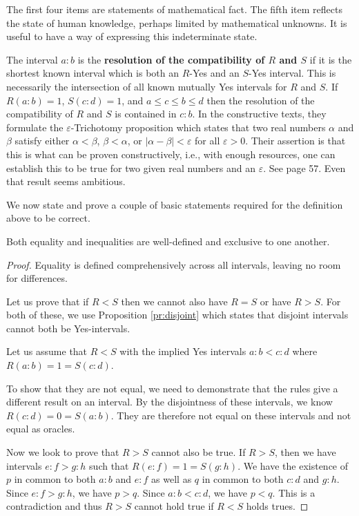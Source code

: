 \documentclass[12pt]{article}
\begin{document}
The first four items are statements of mathematical fact. The fifth item reflects the state of human knowledge, perhaps limited by mathematical unknowns. It is useful to have a way of expressing this indeterminate state. 

The interval $a:b$ is the \textbf{resolution of the compatibility of $R$ and $S$} if it is the shortest known interval which is both an $R$-Yes and an $S$-Yes interval. This is necessarily the intersection of all known mutually Yes intervals for $R$ and $S$.  If $R(a:b) = 1$, $S(c:d) = 1$, and $ a \leq c \leq b \leq d$ then the resolution of the compatibility of $R$ and $S$ is contained in $c:b$. In the constructive texts, they formulate the $\varepsilon$-Trichotomy proposition which states that two real numbers $\alpha$ and $\beta$ satisfy either $\alpha < \beta$, $\beta < \alpha$, or $|\alpha - \beta| < \varepsilon$ for all $\varepsilon > 0$. Their assertion is that this is what can be proven constructively, i.e., with enough resources, one can establish this to be true for two given real numbers and an $\varepsilon$. See \cite{bridger} page 57. Even that result seems ambitious. 

We now state and prove a couple of basic statements required for the definition above to be correct. 

\begin{proposition}\label{pr:wd}
Both equality and inequalities are well-defined and exclusive to one another.  
\end{proposition}

\begin{proof}
Equality is defined comprehensively across all intervals, leaving no room for differences. 

Let us prove that if $R < S$ then we cannot also have $R=S$ or have $R > S$. For both of these, we use Proposition \ref{pr:disjoint} which states that disjoint intervals cannot both be Yes-intervals. 

Let us assume that $R<S$ with the implied Yes intervals $a:b < c:d$ where $R(a:b)=1 =S(c:d)$.

To show that they are not equal, we need to demonstrate that the rules give a different result on an interval. By the disjointness of these intervals, we know  $R(c:d) = 0 = S(a:b)$. They are therefore not equal on these intervals and not equal as oracles.  

Now we look to prove that $R>S$ cannot also be true. If $R > S$, then we have intervals $e:f > g:h$ such that $R(e:f) = 1 = S(g:h)$. We have the existence of $p$ in common to both $a:b$ and $e:f$ as well as $q$ in common to both $c:d$ and $g:h$. Since $e:f > g:h$, we have $p > q$. Since $a:b < c:d$, we have $p < q$. This is a contradiction and thus $R>S$ cannot hold true if $R<S$ holds trues.
\end{proof}
\end{document}
